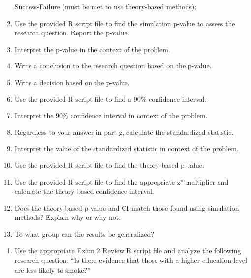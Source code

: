 \documentclass[
]{report}
\providecommand{\tightlist}{%
  \setlength{\itemsep}{0pt}\setlength{\parskip}{0pt}}
\begin{document}
\begin{enumerate}
  Success-Failure (must be met to use theory-based methods):
  \vspace{0.8in}
\item
  Use the provided R script file to find the simulation p-value to assess the research question. Report the p-value.
  \vspace{0.3in}
\item
  Interpret the p-value in the context of the problem.
  \vspace{0.8in}
\item
  Write a conclusion to the research question based on the p-value.
  \vspace{0.8in}
\item
  Write a decision based on the p-value.
  \vspace{0.3in}
\item
  Use the provided R script file to find a 90\% confidence interval.
  \vspace{0.3in}
\item
  Interpret the 90\% confidence interval in context of the problem.
  \vspace{0.8in}
\item
  Regardless to your answer in part g, calculate the standardized statistic.
  \vspace{0.4in}
\item
  Interpret the value of the standardized statistic in context of the problem.
  \vspace{0.8in}
\item
  Use the provided R script file to find the theory-based p-value.
  \vspace{0.3in}
\item
  Use the provided R script file to find the appropriate z* multiplier and calculate the theory-based confidence interval.
  \vspace{0.5in}
\item
  Does the theory-based p-value and CI match those found using simulation methods? Explain why or why not.
  \vspace{0.8in}
\item
  To what group can the results be generalized?
  \vspace{0.8in}
\end{enumerate}

\begin{enumerate}
\def\labelenumi{\arabic{enumi}.}
\setcounter{enumi}{1}
\tightlist
\item
  Use the appropriate Exam 2 Review R script file and analyze the following research question: ``Is there evidence that those with a higher education level are less likely to smoke?''
\end{enumerate}
\end{document}
